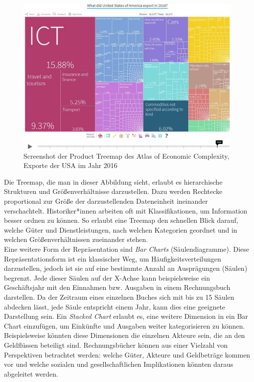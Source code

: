 \documentclass[12pt,a4paper]{article}
\begin{document}
\begin{figure}[H]
\centering
	\includegraphics[width=1\textwidth]{img/atlas.jpg}  
    \caption[Screenshot der Product Treemap des Atlas of Economic Complexity, Exporte der USA im Jahr 2016, atlas.cid.harvard.edu 09.12.2019.]{Screenshot der Product Treemap des Atlas of Economic Complexity, Exporte der USA im Jahr 2016} \label{fig:atlas}
\end{figure}
Die Treemap, die man in dieser Abbildung sieht, erlaubt es hierarchische Strukturen und Größenverhältnisse darzustellen. Dazu werden Rechtecke proportional zur Größe der darzustellenden Dateneinheit ineinander verschachtelt. Historiker*innen arbeiten oft mit Klassifikationen, um Information besser ordnen zu können. So erlaubt eine Treemap den schnellen Blick darauf, welche Güter und Dienstleistungen, nach welchen Kategorien geordnet und in welchen Größenverhältnissen zueinander stehen.
\\
Eine weitere Form der Repräsentation sind \textit{Bar Charts} (Säulendiagramme). Diese Repräsentationsform ist ein klassischer Weg, um Häufigkeitsverteilungen darzustellen, jedoch ist sie auf eine bestimmte Anzahl an Ausprägungen (Säulen) begrenzt. Jede dieser Säulen auf der X-Achse kann beispielsweise ein Geschäftsjahr mit den Einnahmen bzw. Ausgaben in einem Rechnungsbuch darstellen. Da der Zeitraum eines einzelnen Buches sich mit bis zu 15 Säulen abdecken lässt, jede Säule entspricht einem Jahr, kann dies eine geeignete Darstellung sein. Ein \textit{Stacked Chart} erlaubt es, eine weitere Dimension in ein Bar Chart einzufügen, um Einkünfte und Ausgaben weiter kategorisieren zu können. Beispielsweise könnten diese Dimensionen die einzelnen Akteure sein, die an den Geldflüssen beteiligt sind. Rechnungsbücher können aus einer Vielzahl von Perspektiven betrachtet werden: welche Güter, Akteure und Geldbeträge kommen vor und welche sozialen und gesellschaftlichen Implikationen könnten daraus abgeleitet werden.
\end{document}
